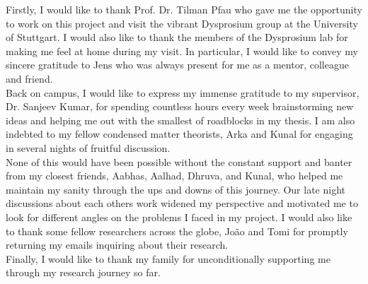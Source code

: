 Firstly, I would like to thank Prof. Dr. Tilman Pfau who gave me the opportunity to work on this project and visit the vibrant Dysprosium group at the University of Stuttgart. I would also like to thank the members of the Dysprosium lab for making me feel at home during my visit. In particular, I would like to convey my sincere gratitude to Jens who was always present for me as a mentor, colleague and friend.  
\vspace{0.5cm}\\
Back on campus, I would like to express my immense gratitude to my supervisor, Dr. Sanjeev Kumar, for spending countless hours every week brainstorming new ideas and helping me out with the smallest of roadblocks in my thesis. I am also indebted to my fellow condensed matter theorists, Arka and Kunal for engaging in several nights of fruitful discussion.
\vspace{0.5cm}\\
None of this would have been possible without the constant support and banter from my closest friends, Aabhas, Aalhad, Dhruva, and Kunal, who helped me maintain my sanity through the ups and downs of this journey. Our late night discussions about each others work widened my perspective and motivated me to look for  different angles on the problems I faced in my project. I would also like to thank some fellow researchers across the globe, João and Tomi for promptly returning my emails inquiring about their research.
\vspace{0.5cm}\\
Finally, I would like to thank my family for unconditionally supporting me through my research journey so far.